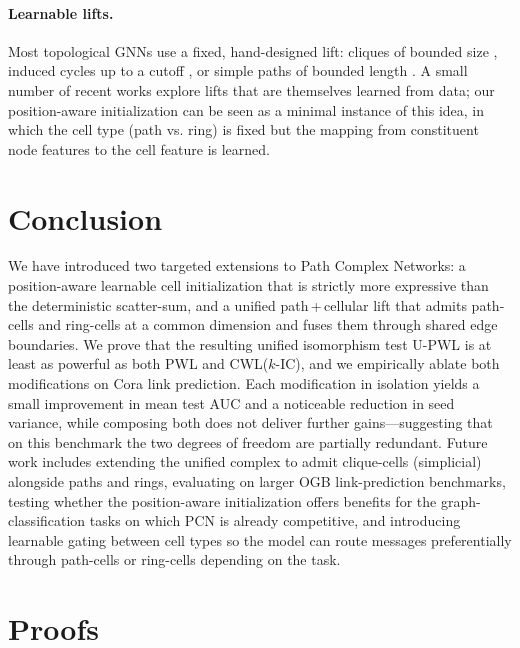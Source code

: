 \documentclass[letterpaper]{article} %
\begin{document}
\paragraph{Learnable lifts.} Most topological GNNs use a fixed, hand-designed lift: cliques of bounded size \cite{bodnar_weisfeiler_2021}, induced cycles up to a cutoff \cite{bodnar_weisfeiler_2022}, or simple paths of bounded length \cite{truong_weisfeiler_2024}. A small number of recent works \cite{hajij_topological_2023} explore lifts that are themselves learned from data; our position-aware initialization can be seen as a minimal instance of this idea, in which the cell type (path vs. ring) is fixed but the mapping from constituent node features to the cell feature is learned.

\section{Conclusion} \label{section:conclusion}
We have introduced two targeted extensions to Path Complex Networks: a position-aware learnable cell initialization that is strictly more expressive than the deterministic scatter-sum, and a unified path\,+\,cellular lift that admits path-cells and ring-cells at a common dimension and fuses them through shared edge boundaries. We prove that the resulting unified isomorphism test U-PWL is at least as powerful as both PWL and CWL(\(k\)-IC), and we empirically ablate both modifications on Cora link prediction. Each modification in isolation yields a small improvement in mean test AUC and a noticeable reduction in seed variance, while composing both does not deliver further gains---suggesting that on this benchmark the two degrees of freedom are partially redundant. Future work includes extending the unified complex to admit clique-cells (simplicial) alongside paths and rings, evaluating on larger OGB link-prediction benchmarks, testing whether the position-aware initialization offers benefits for the graph-classification tasks on which PCN is already competitive, and introducing learnable gating between cell types so the model can route messages preferentially through path-cells or ring-cells depending on the task.



\clearpage
\appendix
\section{Proofs} \label{app:proofs}
\end{document}
